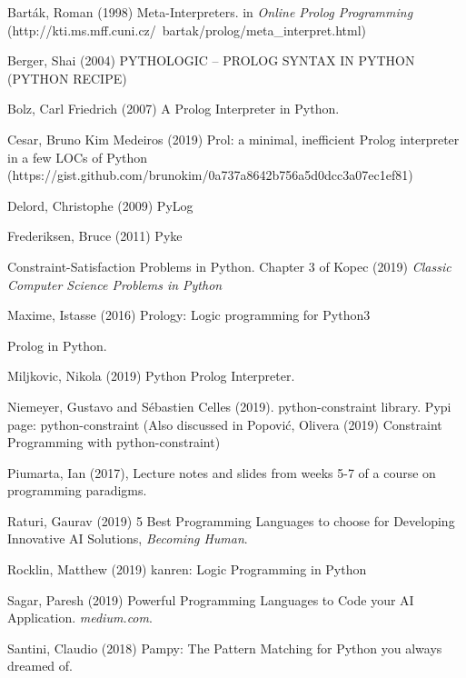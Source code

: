 \begin{thebibliography}{99}

 Barták, Roman (1998) Meta-Interpreters. in \textit{Online Prolog Programming} (http://kti.ms.mff.cuni.cz/~bartak/prolog/meta\_interpret.html)

Berger, Shai (2004) PYTHOLOGIC -- PROLOG SYNTAX IN PYTHON (PYTHON RECIPE)

 Bolz, Carl Friedrich (2007) A Prolog Interpreter in Python.

 Cesar, Bruno Kim Medeiros (2019) Prol: a minimal, inefficient Prolog interpreter in a few LOCs of Python (https://gist.github.com/brunokim/0a737a8642b756a5d0dcc3a07ec1ef81)

 Delord, Christophe (2009) PyLog

 Frederiksen, Bruce (2011) Pyke

 Constraint-Satisfaction Problems in Python. Chapter 3 of Kopec (2019) \textit{Classic Computer Science Problems in Python}

 Maxime, Istasse (2016) Prology: Logic programming for Python3

 Prolog in Python.

Miljkovic, Nikola (2019) Python Prolog Interpreter.

 Niemeyer, Gustavo and Sébastien Celles (2019). python-constraint library. Pypi page: python-constraint (Also discussed in Popović, Olivera (2019) Constraint Programming with python-constraint) 

 Piumarta, Ian (2017), Lecture notes and slides from weeks 5-7 of a course on programming paradigms. %

  Raturi, Gaurav (2019) 5 Best Programming Languages to choose for Developing Innovative AI Solutions, \textit{Becoming Human}.

 Rocklin, Matthew (2019) kanren: Logic Programming in Python

 Sagar, Paresh  (2019) Powerful Programming Languages to Code your AI Application. \textit{medium.com}.

 Santini, Claudio (2018) Pampy: The Pattern Matching for Python you always dreamed of.


\end{thebibliography}
